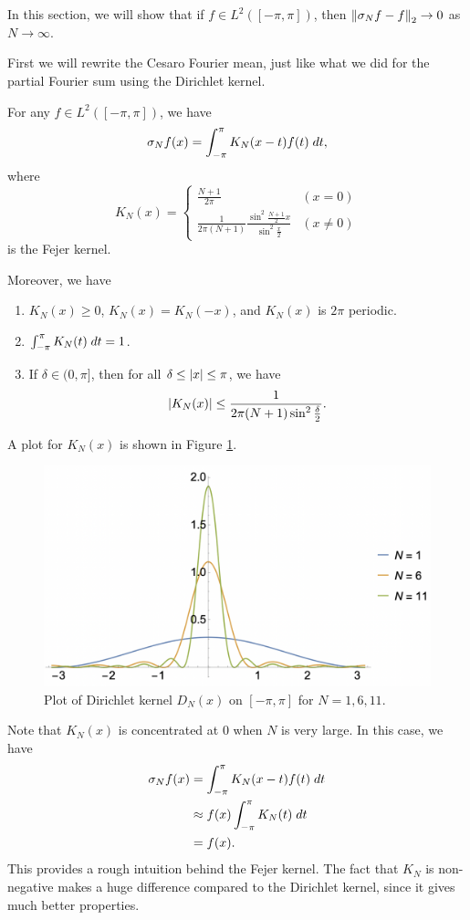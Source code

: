 \documentclass[a4paper]{article}
\begin{document}
In this section, we will show that if $f \in L^2 ([-\pi, \pi])$,
then $\left\lVert \sigma_N f - f\right\rVert_2 \to 0$ as $N \to \infty$.

First we will rewrite the Cesaro Fourier mean, just like 
what we did for the partial Fourier sum using the 
Dirichlet kernel.
\begin{thm}
For any $f \in L^2([-\pi, \pi])$, we have 
\[
\sigma_N f(x) = \int_{-\pi}^\pi K_N(x - t) f(t) \; d t,
\]
where 
\[
K_N(x) = \begin{cases}
  \frac{N+1}{2\pi} & (x = 0) \\
  \frac{1}{2\pi (N + 1)} \frac{\sin^2 \frac{N+1}{2}x}
  {\sin^2 \frac{x}{2}} & (x \neq 0)
\end{cases}
\]
is the Fejer kernel.

Moreover, we have 
\begin{enumerate}
  \item $K_N(x) \geq 0$, $K_N(x) = K_N(-x)$, and $K_N(x)$ 
  is $2\pi$ periodic.

  \item $\int_{-\pi}^\pi K_N(t) \; d t = 1$.
  
  \item If $\delta \in (0, \pi]$, then for all 
  $\delta \leq \left\lvert x\right\rvert \leq \pi$, we have 
  \[
  \left\lvert K_N(x)\right\rvert \leq \frac{1}{2\pi (N+1) \sin^2 \frac{\delta}{2}}.
  \]
\end{enumerate}
\end{thm}

A plot for $K_N(x)$ is shown in Figure \ref{fejer-kernel}. 

\begin{figure}[h!]
  \centering
  \includegraphics[width=0.6\linewidth]{fig/fejer-kernel.png}
  \caption{Plot of Dirichlet kernel $D_N(x)$ on $[-\pi, \pi]$
  for $N = 1,6,11$.}
  \label{fejer-kernel}
\end{figure}

Note that $K_N(x)$ is concentrated at $0$ 
when $N$ is very large. In this case, we have 
\[
\begin{aligned}
  \sigma_N f(x) 
  &= \int_{-\pi}^\pi K_N(x - t) f(t) \; d t \\
  &\approx f(x) \int_{-\pi}^\pi K_N(t) \; d t \\
  &= f(x).
\end{aligned}
\]
This provides a rough intuition behind the Fejer kernel. 
The fact that $K_N$ is non-negative makes a huge difference 
compared to the Dirichlet kernel, since it gives much better 
properties.
\end{document}
